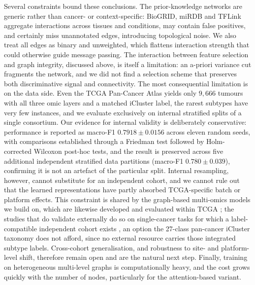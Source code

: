 \documentclass[review,3p,times,11pt, ]{elsarticle} %
\begin{document}

Several constraints bound these conclusions. The prior-knowledge
networks are generic rather than cancer- or context-specific: BioGRID,
miRDB and TFLink aggregate interactions across tissues and conditions,
may contain false positives, and certainly miss unannotated edges,
introducing topological noise. We also treat all edges as binary and
unweighted, which flattens interaction strength that could otherwise
guide message passing. The interaction between feature selection and
graph integrity, discussed above, is itself a limitation: an a-priori
variance cut fragments the network, and we did not find a selection
scheme that preserves both discriminative signal and connectivity.
The most consequential limitation is on the data side. Even the TCGA
Pan-Cancer Atlas yields only $9{,}666$ tumours with all three omic layers
and a matched iCluster label, the rarest subtypes have very few instances,
and we evaluate exclusively on internal stratified splits of a single
consortium. Our evidence for internal validity is deliberately
conservative: performance is reported as macro-F1 $0.7918 \pm 0.0156$
across eleven random seeds, with comparisons established through a
Friedman test followed by Holm-corrected Wilcoxon post-hoc tests, and the
result is preserved across five additional independent stratified data
partitions (macro-F1 $0.780 \pm 0.039$), confirming it is not an artefact
of the particular split.
Internal resampling, however, cannot substitute for an independent cohort,
and we cannot rule out that the learned representations have partly
absorbed TCGA-specific batch or platform effects. This constraint is
shared by the graph-based multi-omics models we build on, which are
likewise developed and evaluated within TCGA
\cite{li_mogcn_2022,wang_mogonet_2021,kesimoglu_supreme_2022,li_multimodal_2024};
the studies that do validate externally do so on single-cancer tasks for
which a label-compatible independent cohort exists \cite{tanvir_mogat_2024},
an option the 27-class pan-cancer iCluster taxonomy does not afford, since
no external resource carries those integrated subtype labels. Cross-cohort
generalisation, and robustness to site- and platform-level shift, therefore
remain open and are the natural next step. Finally, training on
heterogeneous multi-level graphs is computationally heavy, and the cost
grows quickly with the number of nodes, particularly for the
attention-based variant.
\end{document}
